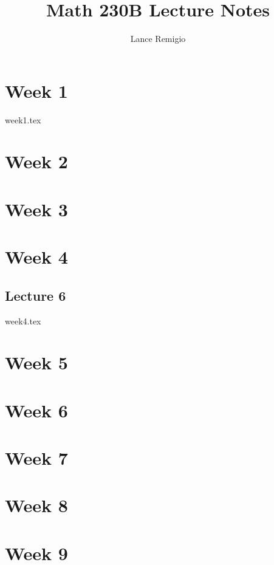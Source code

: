 \documentclass[a4paper]{book}
\title{Math 230B Lecture Notes}
\author{Lance Remigio}
\begin{document}
\maketitle

\chapter{Week 1}

{week1.tex}

\chapter{Week 2}


\chapter{Week 3}



\chapter{Week 4}

\section{Lecture 6}

{week4.tex}


\chapter{Week 5}



\chapter{Week 6}



\chapter{Week 7}



\chapter{Week 8}



\chapter{Week 9}
\end{document}
